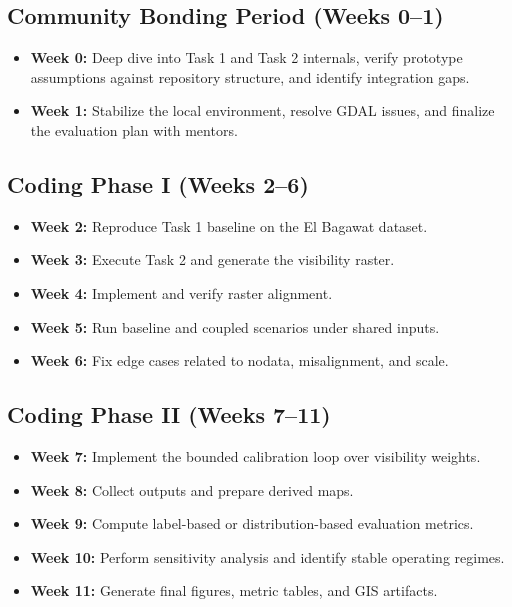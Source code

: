 \documentclass[11pt]{article}
\begin{document}
\subsection{Community Bonding Period (Weeks 0--1)}

\begin{itemize}
  \item \textbf{Week 0:} Deep dive into Task 1 and Task 2 internals, verify prototype assumptions against repository structure, and identify integration gaps.
  \item \textbf{Week 1:} Stabilize the local environment, resolve GDAL issues, and finalize the evaluation plan with mentors.
\end{itemize}

\subsection{Coding Phase I (Weeks 2--6)}

\begin{itemize}
  \item \textbf{Week 2:} Reproduce Task 1 baseline on the El Bagawat dataset.
  \item \textbf{Week 3:} Execute Task 2 and generate the visibility raster.
  \item \textbf{Week 4:} Implement and verify raster alignment.
  \item \textbf{Week 5:} Run baseline and coupled scenarios under shared inputs.
  \item \textbf{Week 6:} Fix edge cases related to nodata, misalignment, and scale.
\end{itemize}

\subsection{Coding Phase II (Weeks 7--11)}

\begin{itemize}
  \item \textbf{Week 7:} Implement the bounded calibration loop over visibility weights.
  \item \textbf{Week 8:} Collect outputs and prepare derived maps.
  \item \textbf{Week 9:} Compute label-based or distribution-based evaluation metrics.
  \item \textbf{Week 10:} Perform sensitivity analysis and identify stable operating regimes.
  \item \textbf{Week 11:} Generate final figures, metric tables, and GIS artifacts.
\end{itemize}
\end{document}

